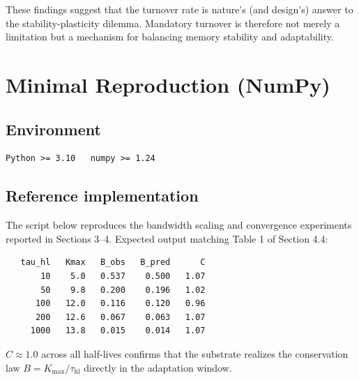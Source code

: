 \documentclass[11pt]{article}
\begin{document}
These findings suggest that the turnover rate is nature's (and design's) answer to the stability-plasticity dilemma. Mandatory turnover is therefore not merely a limitation but a mechanism for balancing memory stability and adaptability.

\appendix
\section{Minimal Reproduction (NumPy)}
\label{app:repro}

\subsection*{Environment}

\begin{verbatim}
Python >= 3.10   numpy >= 1.24
\end{verbatim}

\subsection*{Reference implementation}

The script below reproduces the bandwidth scaling and convergence experiments reported in Sections 3--4.
Expected output matching Table 1 of Section 4.4:
\begin{verbatim}
   tau_hl   Kmax   B_obs   B_pred      C
       10    5.0   0.537    0.500   1.07
       50    9.8   0.200    0.196   1.02
      100   12.0   0.116    0.120   0.96
      200   12.6   0.067    0.063   1.07
     1000   13.8   0.015    0.014   1.07
\end{verbatim}
$C \approx 1.0$ across all half-lives confirms that the substrate realizes the
conservation law $B = K_{\max}/\tau_{\text{hl}}$ directly in the adaptation window.
\end{document}

